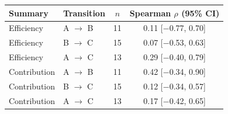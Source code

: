 \begin{tabular}{llcc}
\toprule
Summary & Transition & $n$ & Spearman $\rho$ (95\% CI) \\
\midrule
Efficiency & A $\to$ B & 11 & 0.11 [$-$0.77, 0.70] \\
Efficiency & B $\to$ C & 15 & 0.07 [$-$0.53, 0.63] \\
Efficiency & A $\to$ C & 13 & 0.29 [$-$0.40, 0.79] \\
Contribution & A $\to$ B & 11 & 0.42 [$-$0.34, 0.90] \\
Contribution & B $\to$ C & 15 & 0.12 [$-$0.34, 0.57] \\
Contribution & A $\to$ C & 13 & 0.17 [$-$0.42, 0.65] \\
\bottomrule
\end{tabular}
